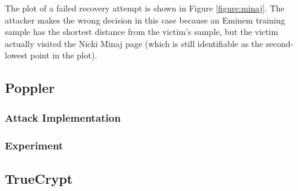 \documentclass[letterpaper,twocolumn,10pt]{article}
\begin{document}
The plot of a failed recovery attempt is shown in Figure \ref{figure:minaj}. The
attacker makes the wrong decision in this case because an Eminem training sample
has the shortest distance from the victim's sample, but the victim actually
visited the Nicki Minaj page (which is still identifiable as the second-lowest
point in the plot).

\begin{figure*}
    \centering
    
    \caption{A successful recovery. The Levenshtein distance between the
    training samples and a recording of the victim visiting the YouTube
    Wikipedia page. The shortest distance is visible at mark 68 on the page axis
    which corresponds to a YouTube training sample. The outlier at mark 29
    corresponds to a disambiguation page that has a different format from the
usual Wikipedia page. The different shapes in a column represent the five
training samples of that page. The order on the page axis is not meaningful.}
    \label{figure:youtube}
\end{figure*}

\begin{figure*}
    \centering
    
    \caption{A failed recovery. The Levenshtein distance between the training samples and
        a recording of the victim visiting the Nicki Minaj Wikipedia page. The
        shortest distance (97 on the page axis) corresponds to a training sample
        of the Eminem Wikipedia page. The Nicki Minaj training samples still
        stand out (55 on the page axis). The different shapes in a column
        represent the five training samples of that page. The order on the page
        axis is not meaningful.}
    \label{figure:minaj}
\end{figure*}

\subsection{Poppler}

\subsubsection{Attack Implementation}

\subsubsection{Experiment}

\subsection{TrueCrypt}
\end{document}
